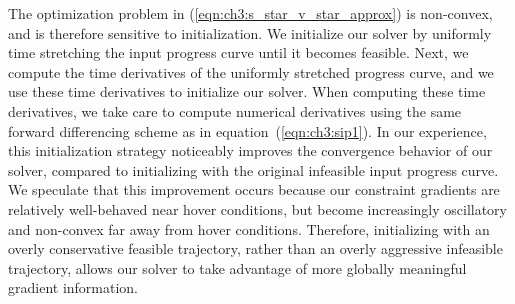 The optimization problem in (\ref{eqn:ch3:s_star_v_star_approx}) is non-convex, and is therefore sensitive to initialization.
We initialize our solver by uniformly time stretching the input progress curve until it becomes feasible.
Next, we compute the time derivatives of the uniformly stretched progress curve, and we use these time derivatives to initialize our solver.
When computing these time derivatives, we take care to compute numerical derivatives using the same forward differencing scheme as in equation~(\ref{eqn:ch3:sip1}).
In our experience, this initialization strategy noticeably improves the convergence behavior of our solver, compared to initializing with the original infeasible input progress curve.
We speculate that this improvement occurs because our constraint gradients are relatively well-behaved near hover conditions, but become increasingly oscillatory and non-convex far away from hover conditions.
Therefore, initializing with an overly conservative feasible trajectory, rather than an overly aggressive infeasible trajectory, allows our solver to take advantage of more globally meaningful gradient information.

